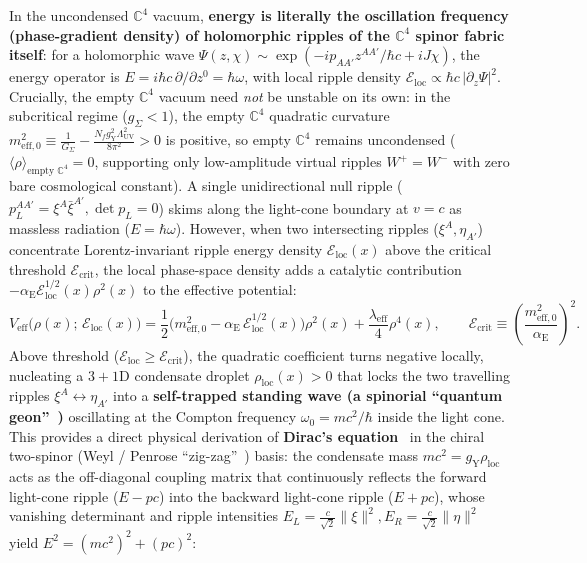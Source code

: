 \documentclass[11pt,a4paper]{article}
\begin{document}
\begin{enumerate}
    In the uncondensed $\mathbb{C}^4$ vacuum, \textbf{energy is literally the oscillation frequency (phase-gradient density) of holomorphic ripples of the $\mathbb{C}^4$ spinor fabric itself}: for a holomorphic wave $\Psi(z,\chi) \sim \exp(-i p_{AA'}z^{AA'}/\hbar c + iJ\chi)$, the energy operator is $E = i\hbar c\,\partial/\partial z^0 = \hbar\omega$, with local ripple density $\mathcal{E}_{\text{loc}} \propto \hbar c\,|\partial_z\Psi|^2$. Crucially, the empty $\mathbb{C}^4$ vacuum need \emph{not} be unstable on its own: in the subcritical regime ($g_\Sigma < 1$), the empty $\mathbb{C}^4$ quadratic curvature $m_{\text{eff},0}^2 \equiv \frac{1}{G_\Sigma} - \frac{N_f g_{\text{Y}}^2 \Lambda_{\text{UV}}^2}{8\pi^2} > 0$ is positive, so empty $\mathbb{C}^4$ remains uncondensed ($\langle\rho\rangle_{\text{empty }\mathbb{C}^4} = 0$, supporting only low-amplitude virtual ripples $W^+ = W^-$ with zero bare cosmological constant). A single unidirectional null ripple ($p_L^{AA'} = \xi^A\bar{\xi}^{A'}, \det p_L = 0$) skims along the light-cone boundary at $v = c$ as massless radiation ($E = \hbar\omega$). However, when two intersecting ripples ($\xi^A, \eta_{A'}$) concentrate Lorentz-invariant ripple energy density $\mathcal{E}_{\text{loc}}(x)$ above the critical threshold $\mathcal{E}_{\text{crit}}$, the local phase-space density adds a catalytic contribution $-\alpha_{\text{E}}\mathcal{E}_{\text{loc}}^{1/2}(x)\rho^2(x)$ to the effective potential:
    \begin{equation}
    V_{\text{eff}}\big(\rho(x);\, \mathcal{E}_{\text{loc}}(x)\big) = \frac{1}{2}\Big( m_{\text{eff},0}^2 - \alpha_{\text{E}}\, \mathcal{E}_{\text{loc}}^{1/2}(x) \Big)\rho^2(x) + \frac{\lambda_{\text{eff}}}{4}\rho^4(x), \qquad \mathcal{E}_{\text{crit}} \equiv \left(\frac{m_{\text{eff},0}^2}{\alpha_{\text{E}}}\right)^2.
    \end{equation}
    Above threshold ($\mathcal{E}_{\text{loc}} \ge \mathcal{E}_{\text{crit}}$), the quadratic coefficient turns negative locally, nucleating a $3+1\text{D}$ condensate droplet $\rho_{\text{loc}}(x) > 0$ that locks the two travelling ripples $\xi^A \leftrightarrow \eta_{A'}$ into a \textbf{self-trapped standing wave (a spinorial ``quantum geon''~\cite{Wheeler1955})} oscillating at the Compton frequency $\omega_0 = mc^2/\hbar$ inside the light cone. This provides a direct physical derivation of \textbf{Dirac's equation}~\cite{Dirac1928} in the chiral two-spinor (Weyl / Penrose ``zig-zag''~\cite{PenroseRoad2004}) basis: the condensate mass $mc^2 = g_{\text{Y}}\rho_{\text{loc}}$ acts as the off-diagonal coupling matrix that continuously reflects the forward light-cone ripple ($E - pc$) into the backward light-cone ripple ($E + pc$), whose vanishing determinant and ripple intensities $E_L = \frac{c}{\sqrt{2}}\|\xi\|^2, E_R = \frac{c}{\sqrt{2}}\|\eta\|^2$ yield $E^2 = (mc^2)^2 + (pc)^2$:

\end{enumerate}
\end{document}
